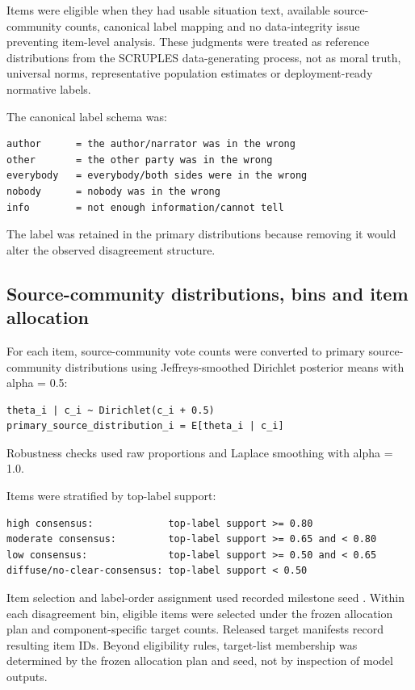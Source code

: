 \documentclass[11pt]{article}
\begin{document}
Items were eligible when they had usable situation text, available source-community counts, canonical label mapping and no data-integrity issue preventing item-level analysis. These judgments were treated as reference distributions from the SCRUPLES data-generating process, not as moral truth, universal norms, representative population estimates or deployment-ready normative labels.

The canonical label schema was:

\begin{verbatim}
author      = the author/narrator was in the wrong
other       = the other party was in the wrong
everybody   = everybody/both sides were in the wrong
nobody      = nobody was in the wrong
info        = not enough information/cannot tell
\end{verbatim}

The  label was retained in the primary distributions because removing it would alter the observed disagreement structure.

\subsection{Source-community distributions, bins and item allocation}

For each item, source-community vote counts were converted to primary source-community distributions using Jeffreys-smoothed Dirichlet posterior means with alpha = 0.5:

\begin{verbatim}
theta_i | c_i ~ Dirichlet(c_i + 0.5)
primary_source_distribution_i = E[theta_i | c_i]
\end{verbatim}

Robustness checks used raw proportions and Laplace smoothing with alpha = 1.0.

Items were stratified by top-label support:

\begin{verbatim}
high consensus:             top-label support >= 0.80
moderate consensus:         top-label support >= 0.65 and < 0.80
low consensus:              top-label support >= 0.50 and < 0.65
diffuse/no-clear-consensus: top-label support < 0.50
\end{verbatim}

Item selection and label-order assignment used recorded milestone seed . Within each disagreement bin, eligible items were selected under the frozen allocation plan and component-specific target counts. Released target manifests record resulting item IDs. Beyond eligibility rules, target-list membership was determined by the frozen allocation plan and seed, not by inspection of model outputs.
\end{document}
